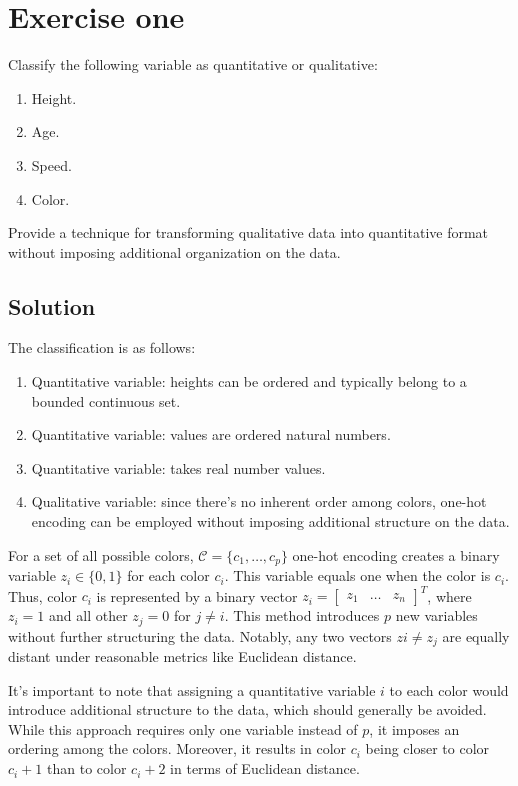 \section{Exercise one}

Classify the following variable as quantitative or qualitative: 
\begin{enumerate}
    \item Height.
    \item Age.
    \item Speed.
    \item Color.
\end{enumerate}
Provide a technique for transforming qualitative data into quantitative format without imposing additional organization on the data.

\subsection*{Solution}
The classification is as follows:
\begin{enumerate}
    \item Quantitative variable: heights can be ordered and typically belong to a bounded continuous set.
    \item Quantitative variable: values are ordered natural numbers.
    \item Quantitative variable: takes real number values.
    \item Qualitative variable: since there's no inherent order among colors, one-hot encoding can be employed without imposing additional structure on the data.
\end{enumerate}
For a set of all possible colors, $\mathcal{C} = \{c_1, \dots , c_p\}$ one-hot encoding creates a binary variable  $z_i \in \{0, 1\}$ for each color $c_i$. 
This variable equals one when the color is $c_i$. 
Thus, color $c_i$ is represented by a binary vector $z_i = \begin{bmatrix} z_1 & \dots & z_n \end{bmatrix}^T$, where $z_i = 1$ and all other $z_j = 0$ for $j \neq i$.
This method introduces $p$ new variables without further structuring the data.
Notably, any two vectors $zi \neq z_j$ are equally distant under reasonable metrics like Euclidean distance.

It's important to note that assigning a quantitative variable $i$ to each color would introduce additional structure to the data, which should generally be avoided.
While this approach requires only one variable instead of $p$, it imposes an ordering among the colors.
Moreover, it results in color $c_i$ being closer to color $c_i+1$ than to color $c_i+2$ in terms of Euclidean distance.